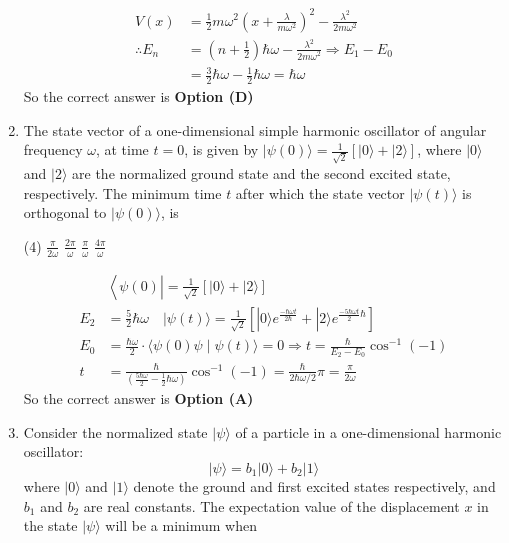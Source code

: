 \begin{enumerate}
\begin{answer}
\begin{align*}
V(x)&=\frac{1}{2} m \omega^{2}\left(x+\frac{\lambda}{m \omega^{2}}\right)^{2}-\frac{\lambda^{2}}{2 m \omega^{2}}\\
\therefore E_{n}&=\left(n+\frac{1}{2}\right) \hbar \omega-\frac{\lambda^{2}}{2 m \omega^{2}} \Rightarrow E_{1}-E_{0}\\&=\frac{3}{2} \hbar \omega-\frac{1}{2} \hbar \omega=\hbar \omega
\end{align*}
So the correct answer is \textbf{Option (D)}
\end{answer}	
\item The state vector of a one-dimensional simple harmonic oscillator of angular frequency $\omega$, at time $t=0$, is given by $|\psi(0)\rangle=\frac{1}{\sqrt{2}}[|0\rangle+|2\rangle]$, where $|0\rangle$ and $|2\rangle$ are the normalized ground state and the second excited state, respectively. The minimum time $t$ after which the state vector $|\psi(t)\rangle$ is orthogonal to $|\psi(0)\rangle$, is
{}
\begin{tasks}(4)
\task[\textbf{A.}] $\frac{\pi}{2 \omega}$ 
\task[\textbf{B.}] $\frac{2 \pi}{\omega}$
\task[\textbf{C.}] $\frac{\pi}{\omega}$
\task[\textbf{D.}] $\frac{4 \pi}{\omega}$
\end{tasks}
\begin{answer}
\begin{align*}
&\left\langle\psi(0)\left|=\frac{1}{\sqrt{2}}[|0\rangle+|2\rangle]\right.\right.\\
E_{2}&=\frac{5}{2} \hbar \omega \quad|\psi(t)\rangle=\frac{1}{\sqrt{2}}\left[|0\rangle e^{\frac{-\hbar \omega t}{2 \hbar}}+|2\rangle e^{\frac{-5 \hbar \omega t}{2} \hbar}\right]\\
E_{0}&=\frac{\hbar \omega}{2} \cdot\langle\psi(0) \psi \mid \psi(t)\rangle=0 \Rightarrow t=\frac{\hbar}{E_{2}-E_{0}} \cos ^{-1}(-1)\\
t&=\frac{\hbar}{\left(\frac{5 \hbar \omega}{2}-\frac{1}{2} \hbar \omega\right)} \cos ^{-1}(-1)=\frac{\hbar}{2 \hbar \omega / 2} \pi=\frac{\pi}{2 \omega}
\end{align*}
So the correct answer is \textbf{Option (A)}
\end{answer}	
\item Consider the normalized state $|\psi\rangle$ of a particle in a one-dimensional harmonic oscillator:
$$
|\psi\rangle=b_{1}|0\rangle+b_{2}|1\rangle
$$
where $|0\rangle$ and $|1\rangle$ denote the ground and first excited states respectively, and $b_{1}$ and $b_{2}$ are real constants. The expectation value of the displacement $x$ in the state $|\psi\rangle$ will be a minimum when

\end{enumerate}
